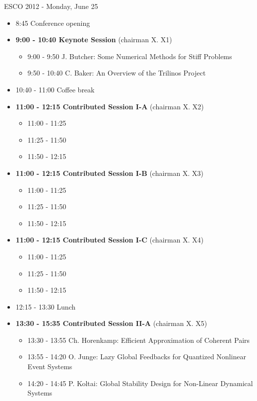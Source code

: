 \documentclass[10pt, A4]{article}%
\begin{document}
\centerline{\huge ESCO 2012 - Monday, June 25}
\vspace{4mm}

\begin{itemize}    
  \item 8:45 Conference opening
  \item {\bf 9:00 - 10:40 Keynote Session} (chairman X. X1) 
  \begin{itemize}
    \item 9:00 - 9:50 J. Butcher: Some Numerical Methods for Stiff Problems
    \item 9:50 - 10:40 C. Baker: An Overview of the Trilinos Project
  \end{itemize}
  \item 10:40 - 11:00 Coffee break
  \item {\bf 11:00 - 12:15 Contributed Session I-A} (chairman X. X2) 
  \begin{itemize}
    \item 11:00 - 11:25 
    \item 11:25 - 11:50 
    \item 11:50 - 12:15 
  \end{itemize}
  \item {\bf 11:00 - 12:15 Contributed Session I-B} (chairman X. X3) 
  \begin{itemize}
    \item 11:00 - 11:25 
    \item 11:25 - 11:50 
    \item 11:50 - 12:15 
  \end{itemize}
  \item {\bf 11:00 - 12:15 Contributed Session I-C} (chairman X. X4) 
  \begin{itemize}
    \item 11:00 - 11:25 
    \item 11:25 - 11:50 
    \item 11:50 - 12:15 
  \end{itemize}
  \item 12:15 - 13:30 Lunch
  \item {\bf 13:30 - 15:35 Contributed Session II-A} (chairman X. X5) 
  \begin{itemize}
    \item 13:30 - 13:55 Ch. Horenkamp: Efficient Approximation of Coherent Pairs
    \item 13:55 - 14:20 O. Junge: Lazy Global Feedbacks for Quantized Nonlinear Event Systems
    \item 14:20 - 14:45 P. Koltai: Global Stability Design for Non-Linear Dynamical Systems

\end{itemize}
\end{itemize}
\end{document}
